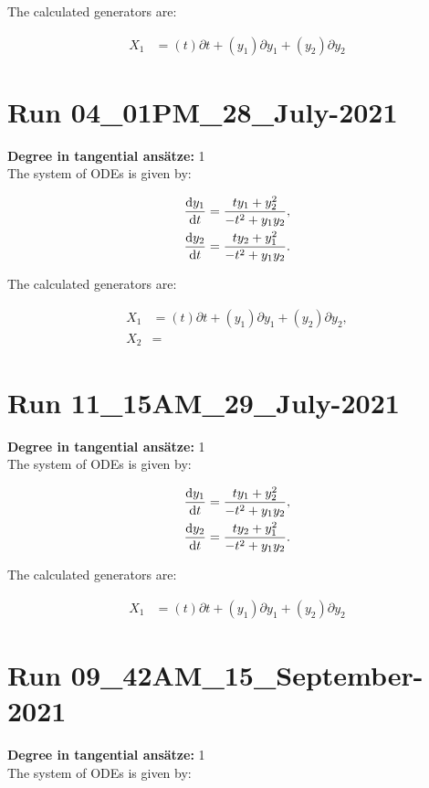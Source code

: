 \noindent The calculated generators are:

\begin{align*}
X_{1}&=\left( t \right)\partial t+\left( y_{1} \right)\partial y_{1}+\left( y_{2} \right)\partial y_{2}\end{align*}
\section*{Run 04\_01PM\_28\_July-2021}
\textbf{Degree in tangential ansätze:}	1\\
The system of ODEs is given by:

\begin{align*}
\dv{y_{1}}{t}&=\frac{t y_{1} + y_{2}^{2}}{- t^{2} + y_{1} y_{2}},\\
\dv{y_{2}}{t}&=\frac{t y_{2} + y_{1}^{2}}{- t^{2} + y_{1} y_{2}}.\\
\end{align*}

\noindent The calculated generators are:

\begin{align*}
X_{1}&=\left( t \right)\partial t+\left( y_{1} \right)\partial y_{1}+\left( y_{2} \right)\partial y_{2},\\
X_{2}&=\end{align*}
\section*{Run 11\_15AM\_29\_July-2021}
\textbf{Degree in tangential ansätze:}	1\\
The system of ODEs is given by:

\begin{align*}
\dv{y_{1}}{t}&=\frac{t y_{1} + y_{2}^{2}}{- t^{2} + y_{1} y_{2}},\\
\dv{y_{2}}{t}&=\frac{t y_{2} + y_{1}^{2}}{- t^{2} + y_{1} y_{2}}.\\
\end{align*}

\noindent The calculated generators are:

\begin{align*}
X_{1}&=\left( t \right)\partial t+\left( y_{1} \right)\partial y_{1}+\left( y_{2} \right)\partial y_{2}\end{align*}
\section*{Run 09\_42AM\_15\_September-2021}
\textbf{Degree in tangential ansätze:}	1\\
The system of ODEs is given by:

